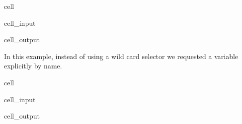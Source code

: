 \documentclass[letterpaper,10pt,english]{jupyterBook}
\begin{document}
\begin{sphinxuseclass}{cell}\begin{sphinxVerbatimInput}

\begin{sphinxuseclass}{cell_input}
\begin{sphinxVerbatim}[commandchars=\\\{\}]
\PYG{p}{[}\PYG{p}{]} 
\end{sphinxVerbatim}

\end{sphinxuseclass}\end{sphinxVerbatimInput}
\begin{sphinxVerbatimOutput}

\begin{sphinxuseclass}{cell_output}
\noindent{}

\noindent{}

\end{sphinxuseclass}\end{sphinxVerbatimOutput}

\end{sphinxuseclass}
\sphinxAtStartPar
In this example, instead of using a wild card selector we requested a variable explicitly by name.

\begin{sphinxuseclass}{cell}\begin{sphinxVerbatimInput}

\begin{sphinxuseclass}{cell_input}
\begin{sphinxVerbatim}[commandchars=\\\{\}]
\PYG{p}{[}\PYG{p}{]} 
\end{sphinxVerbatim}

\end{sphinxuseclass}\end{sphinxVerbatimInput}
\begin{sphinxVerbatimOutput}

\begin{sphinxuseclass}{cell_output}
\noindent{}

\end{sphinxuseclass}\end{sphinxVerbatimOutput}

\end{sphinxuseclass}
\end{document}

